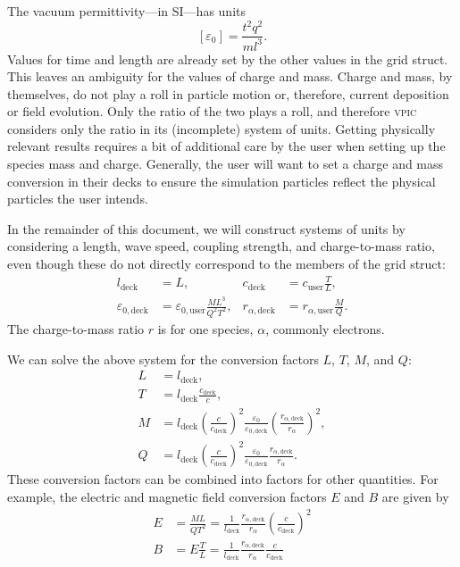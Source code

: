 \documentclass[twocolumn,10pt]{article}
\begin{document}
    The vacuum permittivity---in SI---has units
    \begin{equation}
        \left[\varepsilon_0\right] = \frac{t^2q^2}{ml^3}.
    \end{equation}
    Values for time and length are already set by the other values in the grid struct.
    This leaves an ambiguity for the values of charge and mass.
    Charge and mass, by themselves, do not play a roll in particle motion or, therefore, current deposition or field evolution.
    Only the ratio of the two plays a roll, and therefore \textsc{vpic} considers only the ratio in its (incomplete) system of units.
    Getting physically relevant results requires a bit of additional care by the user when setting up the species mass and charge.
    Generally, the user will want to set a charge and mass conversion in their decks to ensure the simulation particles reflect the physical particles the user intends.

    In the remainder of this document, we will construct systems of units by considering a length, wave speed, coupling strength, and charge-to-mass ratio, even though these do not directly correspond to the members of the grid struct:
	\begin{align*}
		l_{\mathrm{deck}} &= L, &
        c_{\mathrm{deck}} &= c_{\textrm{user}}\frac{T}{L}, \\
        \varepsilon_{0,\mathrm{deck}} &= \varepsilon_{0,\textrm{user}}\frac{ML^3}{Q^2T^2}, &
        r_{\alpha,\mathrm{deck}} &= r_{\alpha,\textrm{user}}\frac{M}{Q}.
	\end{align*}
    The charge-to-mass ratio $r$ is for one species, $\alpha$, commonly electrons.

	We can solve the above system for the conversion factors $L$, $T$, $M$, and $Q$:
	\begin{align}
		L &= l_{\mathrm{deck}}, \\
		T &= l_{\mathrm{deck}}\frac{c_{\mathrm{deck}}}{c}, \\
		M &= l_{\mathrm{deck}}\left(\frac{c}{c_{\mathrm{deck}}}\right)^2\frac{\varepsilon_0}{\varepsilon_{0,\mathrm{deck}}}\left(\frac{r_{\alpha,\mathrm{deck}}}{r_{\alpha}}\right)^2, \\
		Q &= l_{\mathrm{deck}}\left(\frac{c}{c_{\mathrm{deck}}}\right)^2\frac{\varepsilon_0}{\varepsilon_{0,\mathrm{deck}}}\frac{r_{\alpha,\mathrm{deck}}}{r_{\alpha}}.
	\end{align}
    These conversion factors can be combined into factors for other quantities.
	For example, the electric and magnetic field conversion factors $E$ and $B$ are given by
	\begin{align}
		E &= \frac{ML}{QT^2} = \frac{1}{l_{\mathrm{deck}}}\frac{r_{\alpha,\mathrm{deck}}}{r_{\alpha}}\left(\frac{c}{c_{\mathrm{deck}}}\right)^2 \\
		B &= E\frac{T}{L} = \frac{1}{l_{\mathrm{deck}}}\frac{r_{\alpha,\mathrm{deck}}}{r_{\alpha}}\frac{c}{c_{\mathrm{deck}}}
	\end{align}
\end{document}
